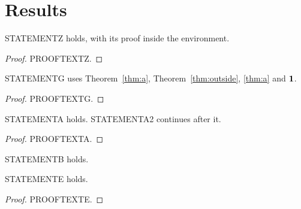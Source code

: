 \section{Results}\label{sec:defs}
\begin{theorem}\label{thm:z}
STATEMENTZ holds, with its proof inside the environment.
\begin{proof}
PROOFTEXTZ.
\end{proof}
\end{theorem}
\begin{theorem}[Result G]\label{thm:g}
STATEMENTG uses Theorem~\ref{thm:a}, Theorem~\ref{thm:outside}, \ref*{thm:a} and $\mathbf1$.
\end{theorem}
\begin{proof}
PROOFTEXTG.
\end{proof}
\begin{lemma}\label{thm:a}
STATEMENTA holds.
STATEMENTA2 continues after it.
\end{lemma}
\begin{proof}
PROOFTEXTA.
\end{proof}
\begin{theorem}\label{thm:b}
STATEMENTB holds.
\end{theorem}
\begin{theorem}\label{thm:e}
STATEMENTE holds.
\end{theorem}
\begin{proof}
PROOFTEXTE.
\end{proof}
